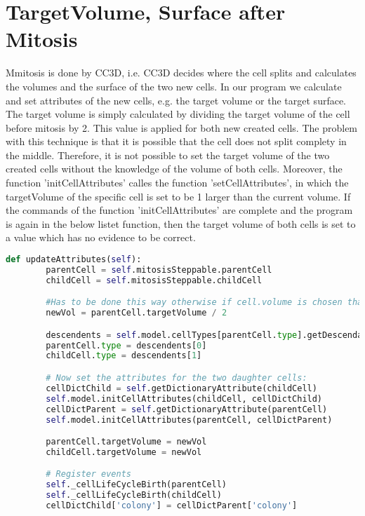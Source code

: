 \section{TargetVolume, Surface after Mitosis}
Mmitosis is done by \ac{CC3D}, i.e. \ac{CC3D} decides where the cell splits and calculates the volumes and the surface of the two new cells. In our program we calculate and set attributes of the new cells, e.g. the target volume or the target surface. The target volume is simply calculated by dividing the target volume of the cell before mitosis by 2. This value is applied for both new created cells. The problem with this technique is that it is possible that the cell does not split complety in the middle. Therefore, it is not possible to set the target volume of the two created cells without the knowledge of the volume of both cells. Moreover, the function 'initCellAttributes' calles the function 'setCellAttributes', in which the targetVolume of the specific cell is set to be 1 larger than the current volume. If the commands of the function 'initCellAttributes' are complete and the program is again in the below listet function, then the target volume of both cells is set to a value which has no evidence to be correct.
\begin{lstlisting}[language=Python, caption=two cells are created by mitosis where the target volume is set at a wrong place]
    def updateAttributes(self):
        parentCell = self.mitosisSteppable.parentCell
        childCell = self.mitosisSteppable.childCell

        #Has to be done this way otherwise if cell.volume is chosen than it disappears
        newVol = parentCell.targetVolume / 2

        descendents = self.model.cellTypes[parentCell.type].getDescendants()
        parentCell.type = descendents[0]
        childCell.type = descendents[1]

        # Now set the attributes for the two daughter cells:
        cellDictChild = self.getDictionaryAttribute(childCell)
        self.model.initCellAttributes(childCell, cellDictChild)
        cellDictParent = self.getDictionaryAttribute(parentCell)
        self.model.initCellAttributes(parentCell, cellDictParent)

        parentCell.targetVolume = newVol
        childCell.targetVolume = newVol

        # Register events
        self._cellLifeCycleBirth(parentCell)
        self._cellLifeCycleBirth(childCell)
		cellDictChild['colony'] = cellDictParent['colony']
\end{lstlisting}\label{lst:TargetVolumeWrongPlace}

